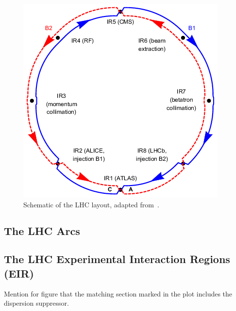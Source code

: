 \begin{figure}[!htb]
  \centering
  \includegraphics*[width=0.8\linewidth]{Figures/Chapter3/temp_lhc_schematic_layout.png}
  \caption{Schematic of the LHC layout, adapted from~\cite{JOI:Aaboud:Comparison_Simulated_Observed_Beam_Background_ATLAS}. }
  \label{figure:lhc_layout}
\end{figure}


\subsection{The LHC Arcs}
\label{subsection:lhc_arcs}

\subsection{The LHC Experimental Interaction Regions (EIR)}
\label{subsection:lhc_eirs}

Mention for figure that the matching section marked in the plot includes the dispersion suppressor.


